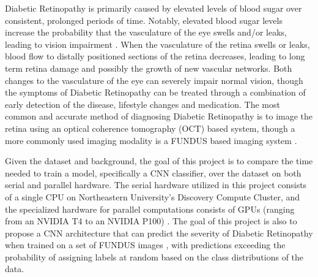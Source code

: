 Diabetic Retinopathy is primarily caused by elevated levels of blood sugar over consistent, prolonged periods of time. Notably, elevated blood sugar levels increase the probability that the vasculature of the eye swells and/or leaks, leading to vision impairment \cite{noauthor_diabetic_nodate-1}. When the vasculature of the retina swells or leaks, blood flow to distally positioned sections of the retina decreases, leading to long term retina damage and possibly the growth of new vascular networks. Both changes to the vasculature of the eye can severely impair normal vision, though the symptoms of Diabetic Retinopathy can be treated through a combination of early detection of the disease, lifestyle changes and medication. The most common and accurate method of diagnosing Diabetic Retinopathy is to image the retina using an optical coherence tomography (OCT) based system, though a more commonly used imaging modality is a FUNDUS based imaging system \cite{noauthor_diabetic_nodate-1}.

Given the dataset and background, the goal of this project is to compare the time needed to train a model, specifically a CNN classifier, over the dataset on both serial and parallel hardware. The serial hardware utilized in this project consists of a single CPU on Northeastern University's Discovery Compute Cluster, and the specialized hardware for parallel computations consists of GPUs (ranging from an NVIDIA T4 to an NVIDIA P100) \cite{noauthor_research_nodate}. The goal of this project is also to propose a CNN architecture that can predict the severity of Diabetic Retinopathy when trained on a set of FUNDUS images \cite{klein_diabetic_1985}, with predictions exceeding the probability of assigning labels at random based on the class distributions of the data.

